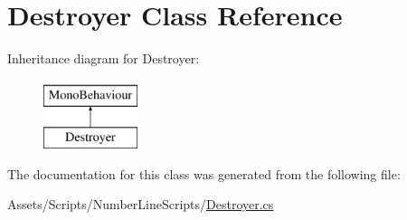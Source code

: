 \hypertarget{classDestroyer}{}\section{Destroyer Class Reference}
\label{classDestroyer}
Inheritance diagram for Destroyer\+:\begin{figure}[H]
\begin{center}
\leavevmode
\includegraphics[height=2.000000cm]{classDestroyer}
\end{center}
\end{figure}


The documentation for this class was generated from the following file\+:\begin{DoxyCompactItemize}
\item 
Assets/\+Scripts/\+Number\+Line\+Scripts/\hyperlink{Destroyer_8cs}{Destroyer.\+cs}\end{DoxyCompactItemize}
